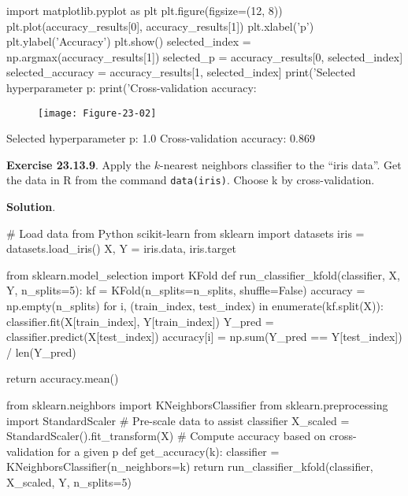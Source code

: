 \begin{python}
import matplotlib.pyplot as plt
plt.figure(figsize=(12, 8))
plt.plot(accuracy_results[0], accuracy_results[1])
plt.xlabel('p')
plt.ylabel('Accuracy')
plt.show()
selected_{i}ndex = np.argmax(accuracy_results[1])
selected_p = accuracy_results[0, selected_{i}ndex]
selected_accuracy = accuracy_results[1, selected_{i}ndex]
print('Selected hyperparameter p: %
print('Cross-validation accuracy: %
\end{python}

\begin{figure}[H]
\centering
\texttt{[image: Figure-23-02]}
\end{figure}

\begin{console}
Selected hyperparameter p: 1.0
Cross-validation accuracy: 0.869
\end{console}

\textbf{Exercise 23.13.9}. Apply the \(k\)-nearest neighbors classifier
to the ``iris data''. Get the data in R from the command
\texttt{data(iris)}. Choose k by cross-validation.

\textbf{Solution}.

\begin{python}
# Load data from Python scikit-learn
from sklearn import datasets
iris = datasets.load_{i}ris()
X, Y = iris.data, iris.target
\end{python}

\begin{python}
from sklearn.model_selection import KFold
def run_classifier_{k}fold(classifier, X, Y, n_splits=5):
    kf = KFold(n_splits=n_splits, shuffle=False)
    accuracy = np.empty(n_splits)
    for i, (train_{i}ndex, test_{i}ndex) in enumerate(kf.split(X)):
        classifier.fit(X[train_{i}ndex], Y[train_{i}ndex])
        Y_pred = classifier.predict(X[test_{i}ndex])
        accuracy[i] = np.sum(Y_pred == Y[test_{i}ndex]) / len(Y_pred)
    
    return accuracy.mean()
\end{python}

\begin{python}
from sklearn.neighbors import KNeighborsClassifier
from sklearn.preprocessing import StandardScaler
# Pre-scale data to assist classifier
X_scaled = StandardScaler().fit_transform(X)
# Compute accuracy based on cross-validation for a given p
def get_accuracy(k):
    classifier = KNeighborsClassifier(n_{n}eighbors=k)
    return run_classifier_{k}fold(classifier, X_scaled, Y, n_splits=5)
\end{python}

